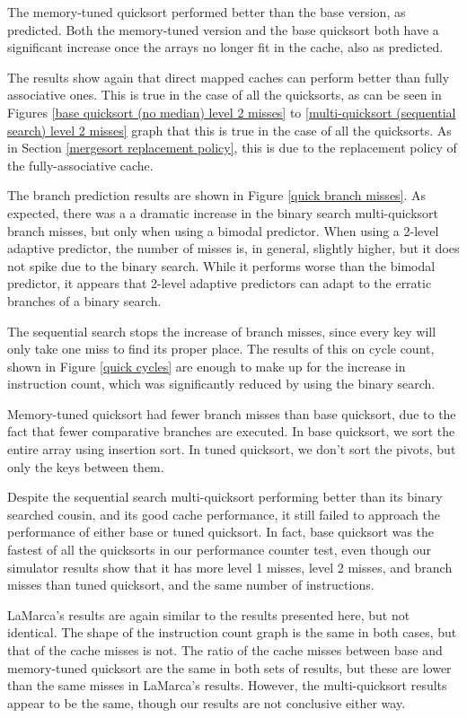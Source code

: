 The memory-tuned quicksort performed better than the base version, as predicted.
Both the memory-tuned version and the base quicksort both have a significant
increase once the arrays no longer fit in the cache, also as predicted.

The results show again that direct mapped caches can perform better than fully
associative ones. This is true in the case of all the quicksorts, as can be seen
in Figures \ref{base quicksort (no median) level 2 misses} to
\ref{multi-quicksort (sequential search) level 2 misses} graph that this is true
in the case of all the quicksorts. As in Section \ref{mergesort replacement
policy}, this is due to the replacement policy of the fully-associative cache.

The branch prediction results are shown in Figure \ref{quick branch misses}. As
expected, there was a a dramatic increase in the binary search multi-quicksort
branch misses, but only when using a bimodal predictor. When using a 2-level
adaptive predictor, the number of misses is, in general, slightly higher, but it
does not spike due to the binary search. While it performs worse than the
bimodal predictor, it appears that 2-level adaptive predictors can adapt to the
erratic branches of a binary search.

The sequential search stops the increase of branch misses, since every key will
only take one miss to find its proper place. The results of this on cycle
count, shown in Figure \ref{quick cycles} are enough to make up for the increase
in instruction count, which was significantly reduced by using the binary
search.

Memory-tuned quicksort had fewer branch misses than base quicksort, due to the fact
that fewer comparative branches are executed. In base quicksort, we sort the
entire array using insertion sort. In tuned quicksort, we don't sort the pivots,
but only the keys between them.

Despite the sequential search multi-quicksort performing better than its
binary searched cousin, and its good cache performance, it still failed to
approach the performance of either base or tuned quicksort. In fact, base
quicksort was the fastest of all the quicksorts in our performance counter test,
even though our simulator results show that it has more level 1 misses, level 2
misses, and branch misses than tuned quicksort, and the same number of
instructions.

LaMarca's results are again similar to the results presented here, but not
identical. The shape of the instruction count graph is the same in both cases,
but that of the cache misses is not. The ratio of the cache misses between base
and memory-tuned quicksort are the same in both sets of results, but these are lower
than the same misses in LaMarca's results. However, the multi-quicksort results
appear to be the same, though our results are not conclusive either way.



